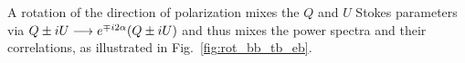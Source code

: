 \documentclass[PICOReport.tex]{subfiles}
\begin{document}
A rotation {\prang} of the direction of polarization mixes the $Q$ and $U$ Stokes parameters via
$Q\pm iU \longrightarrow e^{\mp i 2 \alpha} (Q\pm iU)$
and thus mixes the power spectra and their correlations, as illustrated in Fig.~\ref{fig:rot_bb_tb_eb}.
\end{document}
